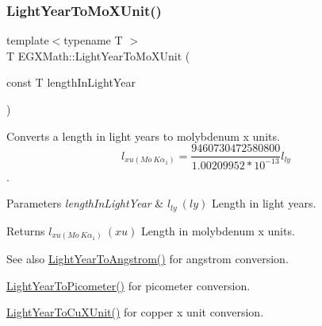 \subsubsection{\texorpdfstring{Light\+Year\+To\+Mo\+X\+Unit()}{LightYearToMoXUnit()}}
{\footnotesize\ttfamily template$<$typename T $>$ \\
T E\+G\+X\+Math\+::\+Light\+Year\+To\+Mo\+X\+Unit (\begin{DoxyParamCaption}\item[{const T}]{length\+In\+Light\+Year }\end{DoxyParamCaption})}



Converts a length in light years to molybdenum x units. \[ l_{xu(Mo\ K\alpha_1)}=\frac{9460730472580800}{1.00209952*10^{-13}} l_{ly}\]. 


\begin{DoxyParams}{Parameters}
{\em length\+In\+Light\+Year} & $ l_{ly}\ (ly)$ Length in light years. \\
\hline
\end{DoxyParams}
\begin{DoxyReturn}{Returns}
$ l_{xu(Mo\ K\alpha_1)}\ (xu)$ Length in molybdenum x units. 
\end{DoxyReturn}
\begin{DoxySeeAlso}{See also}
\mbox{\hyperlink{group___e_g_x_math-_conversions-_length_conversions-_astronomical-_light_year-_non-_s_i_ga09634a7c514e3a0f573e7c171a791f78}{Light\+Year\+To\+Angstrom()}} for angstrom conversion. 

\mbox{\hyperlink{group___e_g_x_math-_conversions-_length_conversions-_astronomical-_light_year-_s_i_ga6dc5dc3c9584f578c4a935552fb965b7}{Light\+Year\+To\+Picometer()}} for picometer conversion. 

\mbox{\hyperlink{group___e_g_x_math-_conversions-_length_conversions-_astronomical-_light_year-_non-_s_i_ga2a345996e344d547ea6db8b7e9174ae8}{Light\+Year\+To\+Cu\+X\+Unit()}} for copper x unit conversion. 
\end{DoxySeeAlso}
